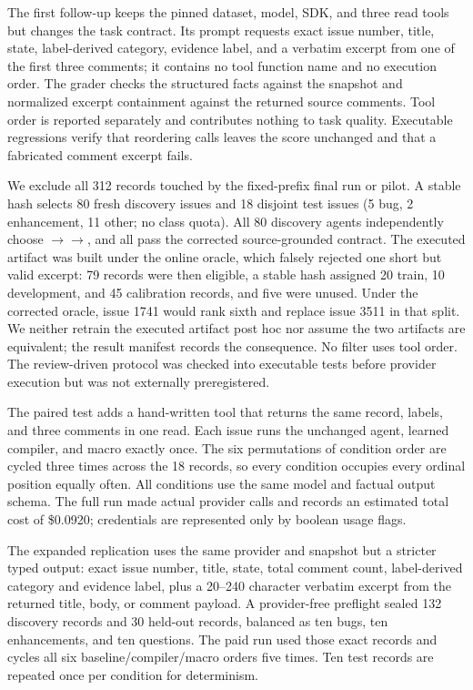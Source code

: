 The first follow-up keeps the pinned dataset, model, SDK, and three read tools but changes the
task contract.  Its prompt requests exact issue number, title, state, label-derived
category, evidence label, and a verbatim excerpt from one of the first three comments; it
contains no tool function name and no execution order.  The grader checks the structured
facts against the snapshot and normalized excerpt containment against the returned source
comments.  Tool order is reported separately and contributes nothing to task quality.
Executable regressions verify that reordering calls leaves the score unchanged and that a
fabricated comment excerpt fails.

We exclude all 312 records touched by the fixed-prefix final run or pilot.  A stable hash
selects 80 fresh discovery issues and 18 disjoint test issues (5 bug, 2 enhancement, 11
other; no class quota).  All 80 discovery agents independently choose
$\rightarrow$$\rightarrow$, and all pass the
corrected source-grounded contract.  The executed artifact was built under the online
oracle, which falsely rejected one short but valid excerpt: 79 records were then eligible,
a stable hash assigned 20 train, 10 development, and 45 calibration records, and five were
unused.  Under the corrected oracle, issue 1741 would rank sixth and replace issue 3511 in
that split.  We neither retrain the executed artifact post hoc nor assume the two artifacts
are equivalent; the result manifest records the consequence.  No filter uses tool order.
The review-driven protocol was checked into executable tests before provider execution but
was not externally preregistered.

The paired test adds a hand-written  tool that returns the same
record, labels, and three comments in one read.  Each issue runs the unchanged agent,
learned compiler, and macro exactly once.  The six permutations of condition order are
cycled three times across the 18 records, so every condition occupies every ordinal
position equally often.  All conditions use the same model and factual output schema.
The full run made actual provider calls and records an estimated total cost of \$0.0920;
credentials are represented only by boolean usage flags.

The expanded replication uses the same provider and snapshot but a stricter typed output:
exact issue number, title, state, total comment count, label-derived category and evidence
label, plus a 20--240 character verbatim excerpt from the returned title, body, or comment
payload.  A provider-free preflight sealed 132 discovery records and 30 held-out records,
balanced as ten bugs, ten enhancements, and ten questions.  The paid run used those exact
records and cycles all six baseline/compiler/macro orders five times.  Ten test records are
repeated once per condition for determinism.

